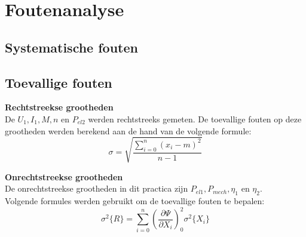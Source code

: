 \documentclass[12pt]{article}
\begin{document}
\section{Foutenanalyse}
\subsection{Systematische fouten}

\subsection{Toevallige fouten}
\textbf{Rechtstreekse grootheden}\\
De $U_1,I_1,M,n$ en $P_{el2}$ werden rechtstreeks gemeten. De toevallige fouten
op deze grootheden werden berekend aan de hand van de volgende formule: 
\begin{equation}
    \sigma=\sqrt{\frac{\sum\limits_{i=0}^n(x_i-m)^2}{n-1}}  
\end{equation}

\noindent \textbf{Onrechtstreekse grootheden}\\
De onrechtstreekse grootheden in dit practica zijn $P_{el1},P_{mech},\eta_{1}$ en
$\eta_2$.\\
Volgende formules werden gebruikt om de toevallige fouten te bepalen:\\
\begin{equation}
    \sigma^2\{R\}=\sum\limits_{i=0}^n\left(\frac{\partial \Psi}{\partial X_i}\right)_0^2 \sigma ^2 \{X_i\}
\end{equation}
\end{document}
